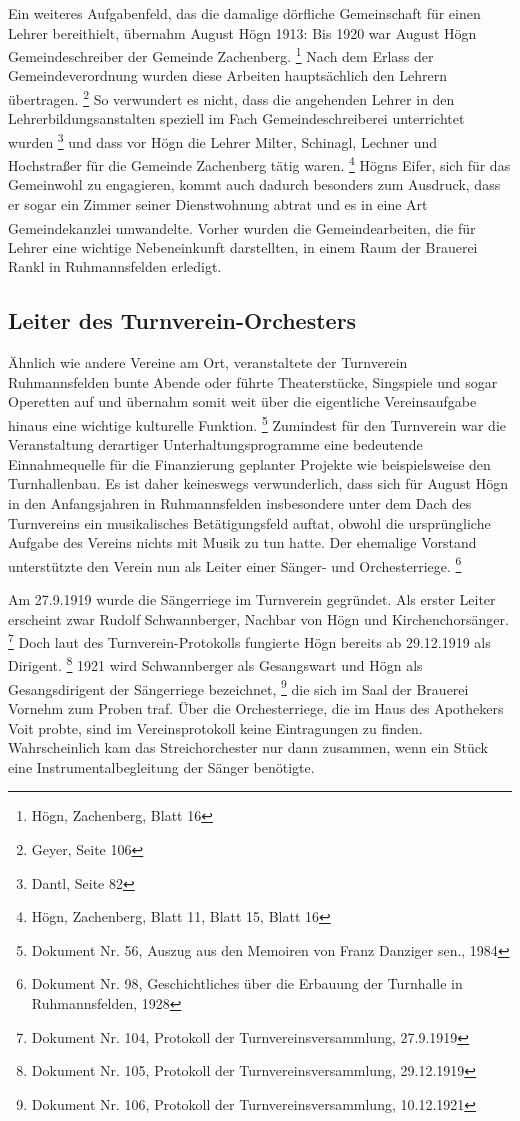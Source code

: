 \documentclass[a4paper]{article}
\newcommand\textstyleFootnoteSymbol[1]{\textsuperscript{#1}}
\begin{document}
Ein weiteres Aufgabenfeld, das die damalige dörfliche Gemeinschaft für
einen Lehrer bereithielt, übernahm August Högn 1913: Bis 1920 war
August Högn Gemeindeschreiber der Gemeinde Zachenberg. \footnote{Högn,
Zachenberg, Blatt 16} Nach dem Erlass der Gemeindeverordnung wurden
diese Arbeiten hauptsächlich den Lehrern übertragen. \footnote{Geyer,
Seite 106} So verwundert es nicht, dass die angehenden Lehrer in den
Lehrerbildungsanstalten speziell im Fach Gemeindeschreiberei
unterrichtet wurden \footnote{Dantl, Seite 82} und dass vor Högn die
Lehrer Milter, Schinagl, Lechner und Hochstraßer für die Gemeinde
Zachenberg tätig waren. \footnote{Högn, Zachenberg, Blatt 11, Blatt 15,
Blatt 16} Högns Eifer, sich für das Gemeinwohl zu engagieren, kommt
auch dadurch besonders zum Ausdruck, dass er sogar ein Zimmer seiner
Dienstwohnung abtrat und es in eine Art Gemeindekanzlei
umwandelte.\textstyleFootnoteSymbol{ }Vorher wurden die
Gemeindearbeiten, die für Lehrer eine wichtige Nebeneinkunft
darstellten, in einem Raum der Brauerei Rankl in Ruhmannsfelden
erledigt.

\subsection{Leiter des Turnverein-Orchesters}
\hypertarget{RefHeadingToc100333730}{}Ähnlich wie andere Vereine am Ort,
veranstaltete der Turnverein Ruhmannsfelden bunte Abende oder führte
Theaterstücke, Singspiele und sogar Operetten auf und übernahm somit
weit über die eigentliche Vereinsaufgabe hinaus eine wichtige
kulturelle Funktion. \footnote{Dokument Nr. 56, Auszug aus den Memoiren
von Franz Danziger sen., 1984} Zumindest für den Turnverein war die
Veranstaltung derartiger Unterhaltungsprogramme eine bedeutende
Einnahmequelle für die Finanzierung geplanter Projekte wie
beispielsweise den Turnhallenbau. Es ist daher keineswegs
verwunderlich, dass sich für August Högn in den Anfangsjahren in
Ruhmannsfelden insbesondere unter dem Dach des Turnvereins ein
musikalisches Betätigungsfeld auftat, obwohl die ursprüngliche Aufgabe
des Vereins nichts mit Musik zu tun hatte. Der ehemalige Vorstand
unterstützte den Verein nun als Leiter einer Sänger- und
Orchesterriege. \footnote{Dokument Nr. 98, Geschichtliches über die
Erbauung der Turnhalle in Ruhmannsfelden, 1928}

Am 27.9.1919 wurde die Sängerriege im Turnverein gegründet. Als erster
Leiter erscheint zwar Rudolf Schwannberger, Nachbar von Högn und
Kirchenchorsänger. \footnote{Dokument Nr. 104, Protokoll der
Turnvereinsversammlung, 27.9.1919} Doch laut des Turnverein-Protokolls
fungierte Högn bereits ab 29.12.1919 als Dirigent. \footnote{Dokument
Nr. 105, Protokoll der Turnvereinsversammlung, 29.12.1919} 1921 wird
Schwannberger als Gesangswart und Högn als Gesangsdirigent der
Sängerriege bezeichnet, \footnote{Dokument Nr. 106, Protokoll der
Turnvereinsversammlung, 10.12.1921} die sich im Saal der Brauerei
Vornehm zum Proben traf. Über die Orchesterriege, die im Haus des
Apothekers Voit probte, sind im Vereinsprotokoll keine Eintragungen zu
finden. Wahrscheinlich kam das Streichorchester nur dann zusammen, wenn
ein Stück eine Instrumentalbegleitung der Sänger benötigte.
\end{document}
